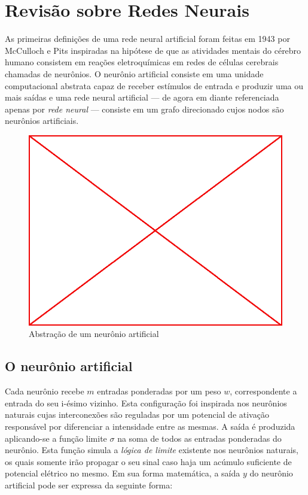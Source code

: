 

\chapter{Revisão sobre Redes Neurais}

As primeiras definições de uma rede neural artificial foram feitas em 1943 por
McCulloch e Pits inspiradas na hipótese de que as atividades mentais do cérebro
humano consistem em reações eletroquímicas em redes de células cerebrais
chamadas de neurônios. O neurônio artificial consiste em uma unidade
computacional abstrata capaz de receber estímulos de entrada e produzir uma ou
mais saídas e uma rede neural artificial --- de agora em diante referenciada
apenas por \emph{rede neural} --- consiste em um grafo direcionado cujos nodos
são neurônios artificiais.

\begin{figure}
  \caption{Abstração de um neurônio artificial}
  \begin{center}
    \includegraphics[scale=0.5]{placeholder}
  \end{center}
\end{figure}

\section{O neurônio artificial}

Cada neurônio recebe $m$ entradas ponderadas por um peso $w$,
correspondente a entrada do seu i-ésimo vizinho. Esta configuração foi
inspirada nos neurônios naturais cujas interconexões são reguladas por um
potencial de ativação responsável por diferenciar a intensidade entre as
mesmas. A saída é produzida aplicando-se a função limite $\sigma$ na soma
de todos as entradas ponderadas do neurônio. Esta função simula a \emph{lógica
  de limite} existente nos neurônios naturais, os quais somente irão propagar o
seu sinal caso haja um acúmulo suficiente de potencial elétrico no mesmo. Em
sua forma matemática, a saída $y$ do neurônio artificial pode ser expressa da
seguinte forma:

